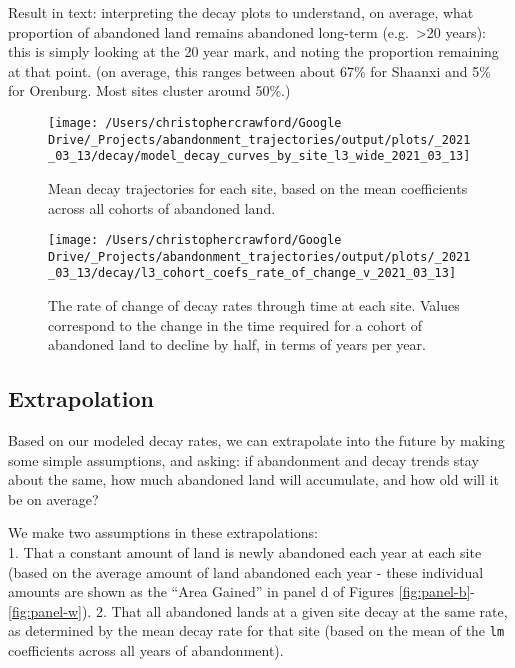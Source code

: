 \documentclass[
]{article}
\begin{document}
Result in text: interpreting the decay plots to understand, on average, what proportion of abandoned land remains abandoned long-term (e.g.~\textgreater20 years): this is simply looking at the 20 year mark, and noting the proportion remaining at that point. (on average, this ranges between about 67\% for Shaanxi and 5\% for Orenburg. Most sites cluster around 50\%.)





\begin{figure}
\texttt{[image: /Users/christophercrawford/Google Drive/\_Projects/abandonment\_trajectories/output/plots/\_2021\_03\_13/decay/model\_decay\_curves\_by\_site\_l3\_wide\_2021\_03\_13]} \caption{Mean decay trajectories for each site, based on the mean coefficients across all cohorts of abandoned land.}\label{fig:decay-curves-by-site}
\end{figure}



\begin{figure}
\texttt{[image: /Users/christophercrawford/Google Drive/\_Projects/abandonment\_trajectories/output/plots/\_2021\_03\_13/decay/l3\_cohort\_coefs\_rate\_of\_change\_v\_2021\_03\_13]} \caption{The rate of change of decay rates through time at each site. Values correspond to the change in the time required for a cohort of abandoned land to decline by half, in terms of years per year.}\label{fig:decay-rate-of-change}
\end{figure}

\hypertarget{extrapolation}{%
\subsection{Extrapolation}\label{extrapolation}}

Based on our modeled decay rates, we can extrapolate into the future by making some simple assumptions, and asking: if abandonment and decay trends stay about the same, how much abandoned land will accumulate, and how old will it be on average?

We make two assumptions in these extrapolations:\\
1. That a constant amount of land is newly abandoned each year at each site (based on the average amount of land abandoned each year - these individual amounts are shown as the ``Area Gained'' in panel d of Figures \ref{fig:panel-b}-\ref{fig:panel-w}).
2. That all abandoned lands at a given site decay at the same rate, as determined by the mean decay rate for that site (based on the mean of the \texttt{lm} coefficients across all years of abandonment).
\end{document}
